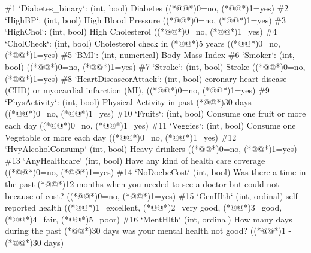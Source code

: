 \documentclass[11pt]{article}
\begin{document}
\begin{codeoutput}
\#1 `Diabetes\_binary`: (int, bool) Diabetes ((*@@*)0=no, (*@@*)1=yes)
\#2 `HighBP`: (int, bool) High Blood Pressure ((*@@*)0=no, (*@@*)1=yes)
\#3 `HighChol`: (int, bool) High Cholesterol ((*@@*)0=no, (*@@*)1=yes)
\#4 `CholCheck`: (int, bool) Cholesterol check in (*@@*)5 years ((*@@*)0=no, (*@@*)1=yes)
\#5 `BMI`: (int, numerical) Body Mass Index
\#6 `Smoker`: (int, bool) ((*@@*)0=no, (*@@*)1=yes)
\#7 `Stroke`: (int, bool) Stroke ((*@@*)0=no, (*@@*)1=yes)
\#8 `HeartDiseaseorAttack`: (int, bool) coronary heart disease (CHD) or myocardial infarction (MI), ((*@@*)0=no, (*@@*)1=yes)
\#9 `PhysActivity`: (int, bool) Physical Activity in past (*@@*)30 days ((*@@*)0=no, (*@@*)1=yes)
\#10 `Fruits`: (int, bool) Consume one fruit or more each day ((*@@*)0=no, (*@@*)1=yes)
\#11 `Veggies`: (int, bool) Consume one Vegetable or more each day ((*@@*)0=no, (*@@*)1=yes)
\#12 `HvyAlcoholConsump` (int, bool) Heavy drinkers ((*@@*)0=no, (*@@*)1=yes)
\#13 `AnyHealthcare` (int, bool) Have any kind of health care coverage ((*@@*)0=no, (*@@*)1=yes)
\#14 `NoDocbcCost` (int, bool) Was there a time in the past (*@@*)12 months when you needed to see a doctor but could not because of cost? ((*@@*)0=no, (*@@*)1=yes)
\#15 `GenHlth` (int, ordinal) self-reported health ((*@@*)1=excellent, (*@@*)2=very good, (*@@*)3=good, (*@@*)4=fair, (*@@*)5=poor)
\#16 `MentHlth` (int, ordinal) How many days during the past (*@@*)30 days was your mental health not good? ((*@@*)1 - (*@@*)30 days)

\end{codeoutput}
\end{document}
